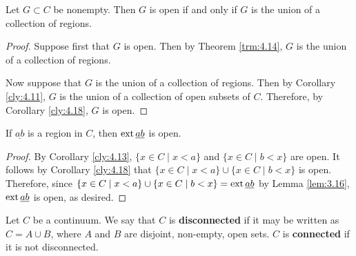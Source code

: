 \documentclass[../main.tex]{subfiles}
\begin{document}
\begin{corollary}\label{cly:4.20}
    Let $G\subset C$ be nonempty. Then $G$ is open if and only if $G$ is the union of a collection of regions.
    \begin{proof}
        Suppose first that $G$ is open. Then by Theorem \ref{trm:4.14}, $G$ is the union of a collection of regions.\par
        Now suppose that $G$ is the union of a collection of regions. Then by Corollary \ref{cly:4.11}, $G$ is the union of a collection of open subsets of $C$. Therefore, by Corollary \ref{cly:4.18}, $G$ is open.
    \end{proof}
\end{corollary}

\begin{corollary}\label{cly:4.21}
    If $\underline{ab}$ is a region in $C$, then $\operatorname{ext}\underline{ab}$ is open.
    \begin{proof}
        By Corollary \ref{cly:4.13}, $\{x\in C\mid x<a\}$ and $\{x\in C\mid b<x\}$ are open. It follows by Corollary \ref{cly:4.18} that $\{x\in C\mid x<a\}\cup\{x\in C\mid b<x\}$ is open. Therefore, since $\{x\in C\mid x<a\}\cup\{x\in C\mid b<x\}=\operatorname{ext}\underline{ab}$ by Lemma \ref{lem:3.16}, $\operatorname{ext}\underline{ab}$ is open, as desired.
    \end{proof}
\end{corollary}

\begin{definition}\label{dfn:4.22}
    Let $C$ be a continuum. We say that $C$ is \textbf{disconnected} if it may be written as $C=A\cup B$, where $A$ and $B$ are disjoint, non-empty, open sets. $C$ is \textbf{connected} if it is not disconnected.
\end{definition}
\end{document}
